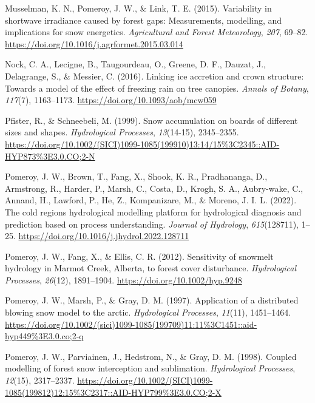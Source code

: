 \documentclass[
  letterpaper,
  DIV=11,
  numbers=noendperiod]{scrartcl}
\newlength{\cslhangindent}
\newenvironment{CSLReferences}[2] %
 {\begin{list}{}{%
  \setlength{\itemindent}{0pt}
  \setlength{\leftmargin}{0pt}
  \setlength{\parsep}{0pt}
  \ifodd #1
   \setlength{\leftmargin}{\cslhangindent}
   \setlength{\itemindent}{-1\cslhangindent}
  \fi
  \setlength{\itemsep}{#2\baselineskip}}}
 {\end{list}}
\begin{document}
\begin{CSLReferences}{1}{0}
Musselman, K. N., Pomeroy, J. W., \& Link, T. E. (2015). Variability in
shortwave irradiance caused by forest gaps: {Measurements}, modelling,
and implications for snow energetics. \emph{Agricultural and Forest
Meteorology}, \emph{207}, 69--82.
\url{https://doi.org/10.1016/j.agrformet.2015.03.014}

Nock, C. A., Lecigne, B., Taugourdeau, O., Greene, D. F., Dauzat, J.,
Delagrange, S., \& Messier, C. (2016). Linking ice accretion and crown
structure: Towards a model of the effect of freezing rain on tree
canopies. \emph{Annals of Botany}, \emph{117}(7), 1163--1173.
\url{https://doi.org/10.1093/aob/mcw059}

Pfister, R., \& Schneebeli, M. (1999). Snow accumulation on boards of
different sizes and shapes. \emph{Hydrological Processes},
\emph{13}(14-15), 2345--2355.
\url{https://doi.org/10.1002/(SICI)1099-1085(199910)13:14/15\%3C2345::AID-HYP873\%3E3.0.CO;2-N}

Pomeroy, J. W., Brown, T., Fang, X., Shook, K. R., Pradhananga, D.,
Armstrong, R., Harder, P., Marsh, C., Costa, D., Krogh, S. A.,
Aubry-wake, C., Annand, H., Lawford, P., He, Z., Kompanizare, M., \&
Moreno, J. I. L. (2022). The cold regions hydrological modelling
platform for hydrological diagnosis and prediction based on process
understanding. \emph{Journal of Hydrology}, \emph{615}(128711), 1--25.
\url{https://doi.org/10.1016/j.jhydrol.2022.128711}

Pomeroy, J. W., Fang, X., \& Ellis, C. R. (2012). Sensitivity of
snowmelt hydrology in {Marmot Creek}, {Alberta}, to forest cover
disturbance. \emph{Hydrological Processes}, \emph{26}(12), 1891--1904.
\url{https://doi.org/10.1002/hyp.9248}

Pomeroy, J. W., Marsh, P., \& Gray, D. M. (1997). Application of a
distributed blowing snow model to the arctic. \emph{Hydrological
Processes}, \emph{11}(11), 1451--1464.
\url{https://doi.org/10.1002/(sici)1099-1085(199709)11:11\%3C1451::aid-hyp449\%3E3.0.co;2-q}

Pomeroy, J. W., Parviainen, J., Hedstrom, N., \& Gray, D. M. (1998).
Coupled modelling of forest snow interception and sublimation.
\emph{Hydrological Processes}, \emph{12}(15), 2317--2337.
\url{https://doi.org/10.1002/(SICI)1099-1085(199812)12:15\%3C2317::AID-HYP799\%3E3.0.CO;2-X}


\end{CSLReferences}
\end{document}
